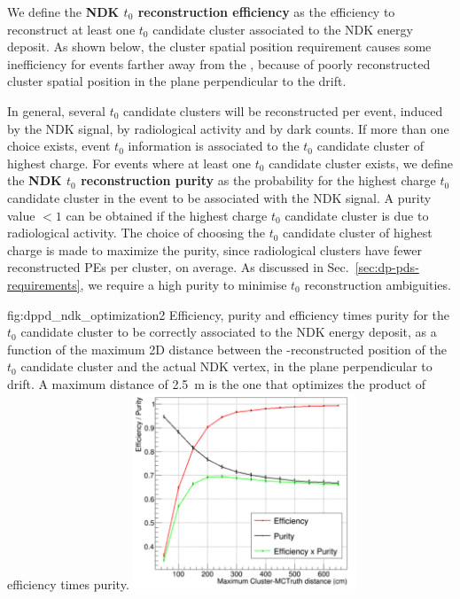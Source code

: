 We define the {\bf NDK $t_0$ reconstruction efficiency} as the efficiency to reconstruct at least one $t_0$ candidate cluster associated to the NDK energy deposit. As shown below, the cluster spatial position requirement causes some inefficiency for events farther away from the , because of poorly reconstructed cluster spatial position in the plane perpendicular to the drift.

In general, several $t_0$ candidate clusters will be reconstructed per event, induced by the NDK signal, by radiological activity and by  dark counts. If more than one choice exists, event $t_0$ information is associated to the $t_0$ candidate cluster of highest charge. For events where at least one $t_0$ candidate cluster exists, we define the {\bf NDK $t_0$ reconstruction purity} as the probability for the highest charge $t_0$ candidate cluster in the event to be associated with the NDK signal. A purity value $<1$ can be obtained if the highest charge $t_0$ candidate cluster is due to radiological activity. The choice of choosing the $t_0$ candidate cluster of highest charge is made to maximize the purity, since radiological clusters have fewer reconstructed PEs per cluster, on average. As discussed in Sec.~\ref{sec:dp-pds-requirements}, we require a high purity to minimise $t_0$ reconstruction ambiguities.
%

\begin{dunefigure}{fig:dppd_ndk_optimization2}
{Efficiency, purity and efficiency times purity for the $t_0$ candidate cluster to be correctly associated to the NDK energy deposit, as a function of the maximum 2D distance between the -reconstructed position of the $t_0$ candidate cluster and the actual NDK vertex, in the plane perpendicular to drift. A maximum distance of \SI{2.5}{\m} is the one that optimizes the product of efficiency times purity.}
\includegraphics[width=0.5\textwidth]{graphics/dppd_ndk_optimization2.pdf}
\end{dunefigure}

